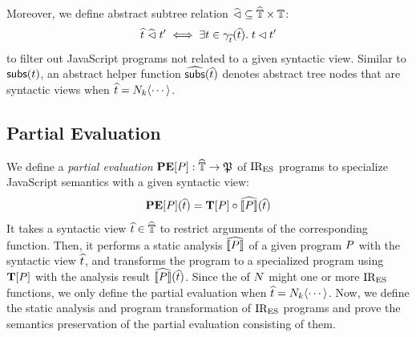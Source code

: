 % 
% 
% 
Moreover, we define abstract subtree relation $\widehat{\lhd} \subseteq \widehat{\mathbb{T}}
\times \mathbb{T}$:
\[
  \widehat{t} \; \widehat{\lhd} \; t' \iff \exists t \in \gamma_{\widehat{t}}(\widehat{t}). \;
  t \lhd t'
\]
to filter out JavaScript programs not related to a given syntactic view.
Similar to $\textsf{subs}(t)$, an abstract helper function $\widehat{\textsf{subs}}(\widehat{t})$
denotes abstract tree nodes that are syntactic views when $\widehat{t} = N_k
\langle \cdots \rangle$.



\subsection{Partial Evaluation}

We define a \textit{partial evaluation} $\textbf{PE}[P]: \widehat{\mathbb{T}} \rightarrow
\mathfrak{P}$ of $\text{IR}_\text{ES}$ programs to specialize JavaScript semantics with a given
syntactic view:
\[
  \textbf{PE}[P](\widehat{t}) = \textbf{T}[P] \circ \widehat{\llbracket{P}\rrbracket} (\widehat{t})
\]
It takes a syntactic view $\widehat{t} \in \widehat{\mathbb{T}}$ to restrict arguments of the
corresponding  function. Then, it performs a static analysis
$\widehat{\llbracket{P}\rrbracket}$ of a given program $P$ with the syntactic view $\widehat{t}$, and
transforms the program to a specialized program using $\textbf{T}[P]$ with
the analysis result $\widehat{\llbracket{P}\rrbracket}(\widehat{t})$.  Since the  of
$N$ might one or more $\text{IR}_\text{ES}$ functions, we only define the partial evaluation
when $\widehat{t} = N_k \langle \cdots \rangle$.  Now, we define the static
analysis and program transformation of $\text{IR}_\text{ES}$ programs and prove the semantics
preservation of the partial evaluation consisting of them.


